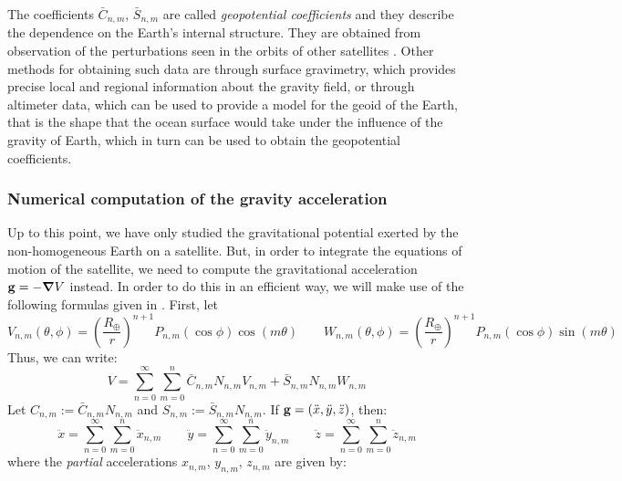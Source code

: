 \documentclass[../main.tex]{subfiles}
\begin{document}
The coefficients $\bar{C}_{n,m}$, $\bar{S}_{n,m}$ are called \emph{geopotential coefficients} and they describe the dependence on the Earth's internal structure. They are obtained from observation of the perturbations seen in the orbits of other satellites \cite{montenbruck}. Other methods for obtaining such data are through surface gravimetry, which provides precise local and regional information about the gravity field, or through altimeter data, which can be used to provide a model for the geoid of the Earth, that is the shape that the ocean surface would take under the influence of the gravity of Earth, which in turn can be used to obtain the geopotential coefficients.
\subsubsection{Numerical computation of the gravity acceleration}
Up to this point, we have only studied the gravitational potential exerted by the non-homogeneous Earth on a satellite. But, in order to integrate the equations of motion of the satellite, we need to compute the gravitational acceleration $\boldsymbol{\mathrm{g}}=-\grad{V}$ instead. In order to do this in an efficient way, we will make use of the following formulas given in \cite{montenbruck,cunningham}. First, let
\begin{equation}
  V_{n,m}(\theta,\phi)={\left(\frac{R_\oplus}{r}\right)}^{n+1} P_{n,m}(\cos\phi)\cos(m \theta)\qquad W_{n,m}(\theta,\phi)={\left(\frac{R_\oplus}{r}\right)}^{n+1} P_{n,m}(\cos\phi)\sin(m \theta)
\end{equation}
Thus, we can write:
\begin{equation}
  V=\sum_{n=0}^\infty \sum_{m=0}^n \bar{C}_{n,m}N_{n,m} V_{n,m}+\bar{S}_{n,m}N_{n,m} W_{n,m}
\end{equation}
Let $C_{n,m}:= \bar{C}_{n,m}N_{n,m}$ and $ S_{n,m}:= \bar{S}_{n,m}N_{n,m}$. If $\boldsymbol{\mathrm{g}}=(\ddot{x}, \ddot{y}, \ddot{z})$, then:
\begin{equation}
  \ddot{x} = \sum_{n=0}^\infty \sum_{m=0}^n\ddot{x}_{n,m}\qquad \ddot{y} = \sum_{n=0}^\infty \sum_{m=0}^n\ddot{y}_{n,m}\qquad \ddot{z} = \sum_{n=0}^\infty \sum_{m=0}^n\ddot{z}_{n,m}
\end{equation}
where the \textit{partial} accelerations $x_{n,m}$, $y_{n,m}$, $z_{n,m}$ are given by:
\end{document}
